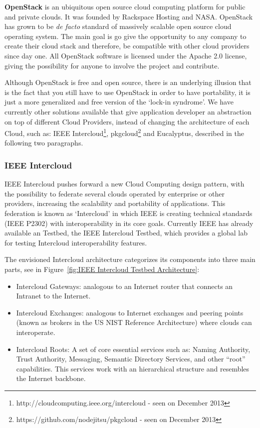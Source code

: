 \textbf{OpenStack} is an ubiquitous open source cloud computing platform for public and private clouds. It was founded by Rackspace Hosting and NASA. OpenStack has grown to be \textit{de facto} standard of massively scalable open source cloud operating system. The main goal is go give the opportunity to any company to create their cloud stack and therefore, be compatible with other cloud providers since day one. All OpenStack software is licensed under the Apache 2.0 license, giving the possibility for anyone to involve the project and contribute. 

Although OpenStack is free and open source, there is an underlying illusion that is the fact that you still have to use OpenStack in order to have portability, it is just a more generalized and free version of the `lock-in syndrome'. We have currently other solutions available that give application developer an abstraction on top of different Cloud Providers, instead of changing the architecture of each Cloud, such as: IEEE Intercloud\footnote{http://cloudcomputing.ieee.org/intercloud - seen on December 2013}, pkgcloud\footnote{https://github.com/nodejitsu/pkgcloud - seen on December 2013} and Eucalyptus\cite{Nurmi2009}, described in the following two paragraphs.


\subsubsection{IEEE Intercloud}\label{par:IEEE Intercloud}

IEEE Intercloud pushes forward a new Cloud Computing design pattern, with the possibility to federate several clouds operated by enterprise or other providers, increasing the scalability and portability of applications. This federation is known as `Intercloud' in which IEEE is creating technical standards (IEEE P2302) with interoperability in its core goals. Currently IEEE has already available an Testbed, the IEEE Intercloud Testbed, which provides a global lab for testing Intercloud interoperability features.

The envisioned Intercloud architecture categorizes its components into three main parts, see in Figure~\ref{fig:IEEE Intercloud Testbed Architecture}:

\begin{itemize}
    \item Intercloud Gateways: analogous to an Internet router that connects an Intranet to the Internet.
    \item Intercloud Exchanges: analogous to Internet exchanges and peering points (known as brokers in the US NIST Reference Architecture) where clouds can interoperate.
    \item Intercloud Roots: A set of core essential services such as: Naming Authority, Trust Authority, Messaging, Semantic Directory Services, and other “root” capabilities. This services work with an hierarchical structure and resembles the Internet backbone.
\end{itemize}

